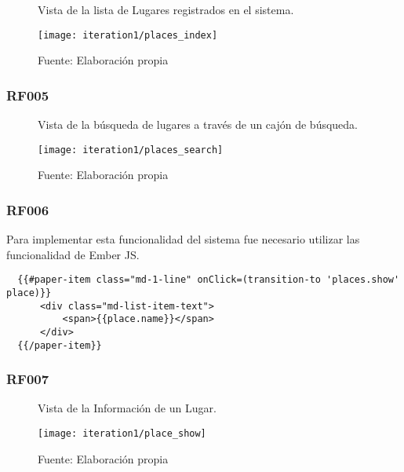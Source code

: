 \begin{figure}[H]
  \begin{center}
    \caption{Vista de la lista de Lugares registrados en el sistema.}
    \label{fig:places_index}
    \texttt{[image: iteration1/places\_index]}
    \caption*{Fuente: Elaboración propia}
  \end{center}
\end{figure}

\subsubsection{RF005}
\label{subs:RF005}

\begin{figure}[H]
  \begin{center}
    \caption{Vista de la búsqueda de lugares a través de un cajón de búsqueda.}
    \label{fig:places_search}
    \texttt{[image: iteration1/places\_search]}
    \caption*{Fuente: Elaboración propia}
  \end{center}
\end{figure}


\subsubsection{RF006}
\label{subs:RF006}

Para implementar esta funcionalidad del sistema fue necesario utilizar las funcionalidad de Ember JS.

\begin{verbatim}
  {{#paper-item class="md-1-line" onClick=(transition-to 'places.show' place)}}
      <div class="md-list-item-text">
          <span>{{place.name}}</span>
      </div>
  {{/paper-item}}
\end{verbatim}

\subsubsection{RF007}
\label{subs:RF007}



\begin{figure}[H]
  \begin{center}
    \caption{Vista de la Información de un Lugar.}
    \label{fig:place_show}
    \texttt{[image: iteration1/place\_show]}
    \caption*{Fuente: Elaboración propia}
  \end{center}
\end{figure}


